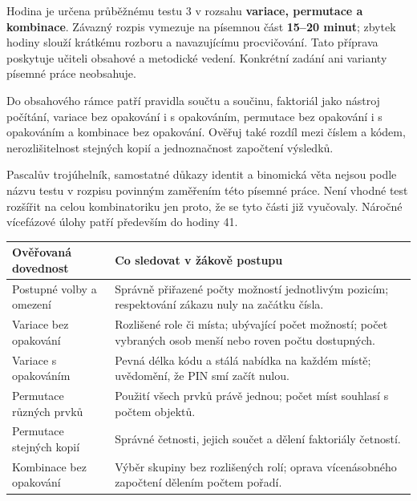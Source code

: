 \documentclass[11pt,a4paper]{article}
\begin{document}
Hodina je určena průběžnému testu 3 v rozsahu \textbf{variace, permutace a kombinace}. Závazný rozpis vymezuje na písemnou část \textbf{15–20 minut}; zbytek hodiny slouží krátkému rozboru a navazujícímu procvičování. Tato příprava poskytuje učiteli obsahové a metodické vedení. Konkrétní zadání ani varianty písemné práce neobsahuje.


Do obsahového rámce patří pravidla součtu a součinu, faktoriál jako nástroj počítání, variace bez opakování i s opakováním, permutace bez opakování i s opakováním a kombinace bez opakování. Ověřuj také rozdíl mezi číslem a kódem, nerozlišitelnost stejných kopií a jednoznačnost započtení výsledků.

Pascalův trojúhelník, samostatné důkazy identit a binomická věta nejsou podle názvu testu v rozpisu povinným zaměřením této písemné práce. Není vhodné test rozšířit na celou kombinatoriku jen proto, že se tyto části již vyučovaly. Náročné vícefázové úlohy patří především do hodiny 41.

\begin{tabularx}{\linewidth}{@{}>{\raggedright\arraybackslash}p{43mm}X@{}}
\toprule
\textbf{Ověřovaná dovednost} & \textbf{Co sledovat v žákově postupu}\\\midrule
Postupné volby a omezení & Správně přiřazené počty možností jednotlivým pozicím; respektování zákazu nuly na začátku čísla.\\
Variace bez opakování & Rozlišené role či místa; ubývající počet možností; počet vybraných osob menší nebo roven počtu dostupných.\\
Variace s opakováním & Pevná délka kódu a stálá nabídka na každém místě; uvědomění, že PIN smí začít nulou.\\
Permutace různých prvků & Použití všech prvků právě jednou; počet míst souhlasí s počtem objektů.\\
Permutace stejných kopií & Správné četnosti, jejich součet a dělení faktoriály četností.\\
Kombinace bez opakování & Výběr skupiny bez rozlišených rolí; oprava vícenásobného započtení dělením počtem pořadí.\\
\bottomrule
\end{tabularx}
\end{document}
